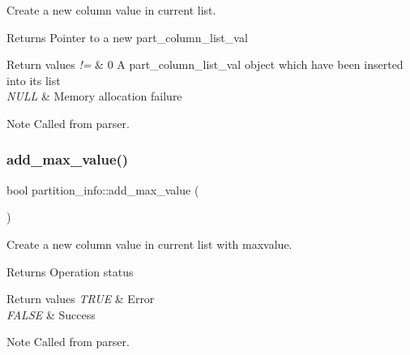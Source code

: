 Create a new column value in current list.

\begin{DoxyReturn}{Returns}
Pointer to a new part\+\_\+column\+\_\+list\+\_\+val 
\end{DoxyReturn}

\begin{DoxyRetVals}{Return values}
{\em !=} & 0 A part\+\_\+column\+\_\+list\+\_\+val object which have been inserted into its list \\
\hline
{\em N\+U\+LL} & Memory allocation failure\\
\hline
\end{DoxyRetVals}
\begin{DoxyNote}{Note}
Called from parser. 
\end{DoxyNote}
\mbox{\label{classpartition__info_abaa009c70b5e2383605e77c3c38e8bdf}} 
\subsubsection{\texorpdfstring{add\+\_\+max\+\_\+value()}{add\_max\_value()}}
{\footnotesize\ttfamily bool partition\+\_\+info\+::add\+\_\+max\+\_\+value (\begin{DoxyParamCaption}{ }\end{DoxyParamCaption})}

Create a new column value in current list with maxvalue.

\begin{DoxyReturn}{Returns}
Operation status 
\end{DoxyReturn}

\begin{DoxyRetVals}{Return values}
{\em T\+R\+UE} & Error \\
\hline
{\em F\+A\+L\+SE} & Success\\
\hline
\end{DoxyRetVals}
\begin{DoxyNote}{Note}
Called from parser. 
\end{DoxyNote}
\mbox{\label{classpartition__info_aec4b89bf3f8f3477dd3b3a2817902019}} 
